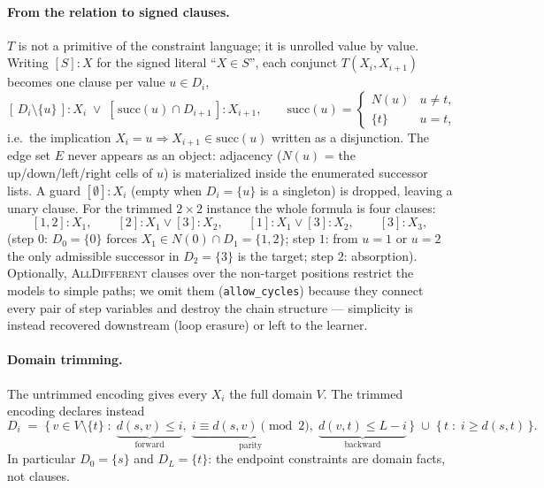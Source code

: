 \paragraph{From the relation to signed clauses.}
$T$ is not a primitive of the constraint language; it is unrolled value
by value. Writing $[S]{:}X$ for the signed literal ``$X\in S$'', each
conjunct $T(X_i,X_{i+1})$ becomes one clause per value $u\in D_i$,
\[
  [\,D_i\setminus\{u\}\,]{:}X_i \;\vee\;
  [\,\mathrm{succ}(u)\cap D_{i+1}\,]{:}X_{i+1},
  \qquad
  \mathrm{succ}(u)=\begin{cases}
    N(u) & u\neq t,\\
    \{t\} & u=t,
  \end{cases}
\]
i.e.\ the implication $X_i{=}u \Rightarrow X_{i+1}\in\mathrm{succ}(u)$
written as a disjunction. The edge set $E$ never appears as an object:
adjacency ($N(u)$ = the up/down/left/right cells of $u$) is materialized
inside the enumerated successor lists. A guard $[\emptyset]{:}X_i$
(empty when $D_i=\{u\}$ is a singleton) is dropped, leaving a unary
clause. For the trimmed $2\times 2$ instance the whole formula is four
clauses:
\[
  [1,2]{:}X_1, \qquad
  [2]{:}X_1 \vee [3]{:}X_2, \qquad
  [1]{:}X_1 \vee [3]{:}X_2, \qquad
  [3]{:}X_3,
\]
(step $0$: $D_0=\{0\}$ forces $X_1\in N(0)\cap D_1=\{1,2\}$; step $1$:
from $u=1$ or $u=2$ the only admissible successor in $D_2=\{3\}$ is the
target; step $2$: absorption). Optionally,
\textsc{AllDifferent} clauses over the non-target positions restrict the
models to simple paths; we omit them (\texttt{allow\_cycles}) because
they connect every pair of step variables and destroy the chain
structure — simplicity is instead recovered downstream (loop erasure) or
left to the learner.

\paragraph{Domain trimming.}
The untrimmed encoding gives every $X_i$ the full domain $V$. The
trimmed encoding declares instead
\[
  D_i \;=\;
  \bigl\{\, v \in V\setminus\{t\} \;:\;
      \underbrace{d(s,v)\le i}_{\text{forward}},\;
      \underbrace{i \equiv d(s,v) \!\!\pmod 2}_{\text{parity}},\;
      \underbrace{d(v,t)\le L-i}_{\text{backward}} \,\bigr\}
  \;\cup\;
  \bigl\{\, t \;:\; i \ge d(s,t) \,\bigr\}.
\]
In particular $D_0=\{s\}$ and $D_L=\{t\}$: the endpoint constraints are
domain facts, not clauses.

